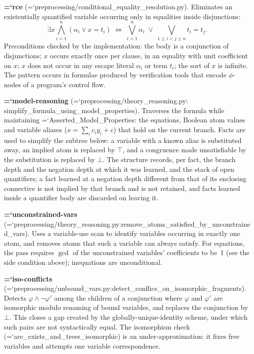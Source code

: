 \documentclass[10pt,a4paper]{article}
\newcommand{\code}[1]{{\small\ttfamily\hyphenchar\font=`\-\relax #1}}
\begin{document}
\textbf{\code{rce}} (\code{preprocessing/conditional\_\allowbreak equality\_\allowbreak resolution.py}).  Eliminates an
existentially quantified variable occurring only in equalities inside disjunctions:
\[
  \exists x \bigwedge_{i=1}^{n}(\alpha_i \vee x = t_i)
  \;\iff\;
  \bigvee_{i=1}^{n} \alpha_i \;\vee\; \bigvee_{1 \leq i < j \leq n} t_i = t_j .
\]
Preconditions checked by the implementation: the body is a conjunction of disjunctions; $x$ occurs
exactly once per clause, in an equality with unit coefficient on $x$; $x$ does not occur in any escape
literal $\alpha_i$ or term $t_i$; the sort of $x$ is infinite.  The pattern occurs in formulae produced
by verification tools that encode $\phi$-nodes of a program's control flow.

\textbf{\code{model-reasoning}} (\code{preprocessing/theory\_\allowbreak reasoning.py:\allowbreak \allowbreak
simplify\_\allowbreak formula\_\allowbreak using\_\allowbreak model\_\allowbreak properties}).  Traverses the formula while maintaining
\code{Asserted\_Model\_Properties}: the equations, Boolean atom values and variable aliases
($x = \sum_i c_i y_i + c$) that hold on the current branch.  Facts are used to simplify the subtree
below: a variable with a known alias is substituted away, an implied atom is replaced by $\top$, and a
congruence made unsatisfiable by the substitution is replaced by $\bot$.  The structure records, per
fact, the branch depth and the negation depth at which it was learned, and the stack of open
quantifiers; a fact learned at a negation depth different from that of its enclosing connective is not
implied by that branch and is not retained, and facts learned inside a quantifier body are discarded on
leaving it.

\textbf{\code{unconstrained-vars}}
(\code{preprocessing/theory\_\allowbreak reasoning.py:\allowbreak remove\_\allowbreak atoms\_\allowbreak satisfied\_\allowbreak by\_\allowbreak unconstrained\_\allowbreak vars}).  Uses a
variable-use scan to identify variables occurring in exactly one atom, and removes atoms that such a
variable can always satisfy.  For equations, the pass requires $\gcd$ of the unconstrained variables'
coefficients to be~1 (see the side condition above); inequations are unconditional.

\textbf{\code{iso-conflicts}}
(\code{preprocessing/unbound\_\allowbreak vars.py:\allowbreak detect\_\allowbreak conflics\_\allowbreak on\_\allowbreak isomorphic\_\allowbreak fragments}).  Detects
$\varphi \wedge \neg\varphi'$ among the children of a conjunction where $\varphi$ and $\varphi'$ are
isomorphic modulo renaming of bound variables, and replaces the conjunction by $\bot$.  This closes a
gap created by the globally-unique-identity scheme, under which such pairs are not syntactically equal.
The isomorphism check (\code{are\_\allowbreak exists\_\allowbreak and\_\allowbreak trees\_\allowbreak isomorphic}) is an under-approximation: it fixes
free variables and attempts one variable correspondence.
\end{document}
